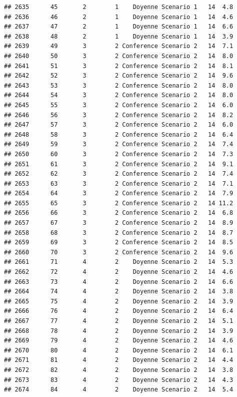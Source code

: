 \documentclass[
]{article}
\begin{document}
\begin{verbatim}
## 2635      45       2        1    Doyenne Scenario 1   14  4.8
## 2636      46       2        1    Doyenne Scenario 1   14  4.6
## 2637      47       2        1    Doyenne Scenario 1   14  6.6
## 2638      48       2        1    Doyenne Scenario 1   14  3.9
## 2639      49       3        2 Conference Scenario 2   14  7.1
## 2640      50       3        2 Conference Scenario 2   14  8.0
## 2641      51       3        2 Conference Scenario 2   14  8.1
## 2642      52       3        2 Conference Scenario 2   14  9.6
## 2643      53       3        2 Conference Scenario 2   14  8.0
## 2644      54       3        2 Conference Scenario 2   14  8.0
## 2645      55       3        2 Conference Scenario 2   14  6.0
## 2646      56       3        2 Conference Scenario 2   14  8.2
## 2647      57       3        2 Conference Scenario 2   14  6.0
## 2648      58       3        2 Conference Scenario 2   14  6.4
## 2649      59       3        2 Conference Scenario 2   14  7.4
## 2650      60       3        2 Conference Scenario 2   14  7.3
## 2651      61       3        2 Conference Scenario 2   14  9.1
## 2652      62       3        2 Conference Scenario 2   14  7.4
## 2653      63       3        2 Conference Scenario 2   14  7.1
## 2654      64       3        2 Conference Scenario 2   14  7.9
## 2655      65       3        2 Conference Scenario 2   14 11.2
## 2656      66       3        2 Conference Scenario 2   14  6.8
## 2657      67       3        2 Conference Scenario 2   14  8.9
## 2658      68       3        2 Conference Scenario 2   14  8.7
## 2659      69       3        2 Conference Scenario 2   14  8.5
## 2660      70       3        2 Conference Scenario 2   14  9.6
## 2661      71       4        2    Doyenne Scenario 2   14  5.3
## 2662      72       4        2    Doyenne Scenario 2   14  4.6
## 2663      73       4        2    Doyenne Scenario 2   14  6.6
## 2664      74       4        2    Doyenne Scenario 2   14  3.8
## 2665      75       4        2    Doyenne Scenario 2   14  3.9
## 2666      76       4        2    Doyenne Scenario 2   14  6.4
## 2667      77       4        2    Doyenne Scenario 2   14  5.1
## 2668      78       4        2    Doyenne Scenario 2   14  3.9
## 2669      79       4        2    Doyenne Scenario 2   14  4.6
## 2670      80       4        2    Doyenne Scenario 2   14  6.1
## 2671      81       4        2    Doyenne Scenario 2   14  4.4
## 2672      82       4        2    Doyenne Scenario 2   14  3.8
## 2673      83       4        2    Doyenne Scenario 2   14  4.3
## 2674      84       4        2    Doyenne Scenario 2   14  5.4

\end{verbatim}
\end{document}
